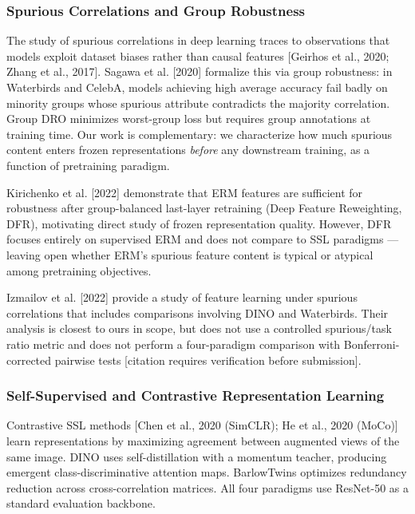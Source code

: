 
\subsubsection{Spurious Correlations and Group Robustness}

The study of spurious correlations in deep learning traces to observations that models exploit dataset biases rather than causal features [Geirhos et al., 2020; Zhang et al., 2017]. Sagawa et al. [2020] formalize this via group robustness: in Waterbirds and CelebA, models achieving high average accuracy fail badly on minority groups whose spurious attribute contradicts the majority correlation. Group DRO minimizes worst-group loss but requires group annotations at training time. Our work is complementary: we characterize how much spurious content enters frozen representations \textit{before} any downstream training, as a function of pretraining paradigm.

Kirichenko et al. [2022] demonstrate that ERM features are sufficient for robustness after group-balanced last-layer retraining (Deep Feature Reweighting, DFR), motivating direct study of frozen representation quality. However, DFR focuses entirely on supervised ERM and does not compare to SSL paradigms --- leaving open whether ERM's spurious feature content is typical or atypical among pretraining objectives.

Izmailov et al. [2022] provide a study of feature learning under spurious correlations that includes comparisons involving DINO and Waterbirds. Their analysis is closest to ours in scope, but does not use a controlled spurious/task ratio metric and does not perform a four-paradigm comparison with Bonferroni-corrected pairwise tests [citation requires verification before submission].

\subsubsection{Self-Supervised and Contrastive Representation Learning}

Contrastive SSL methods [Chen et al., 2020 (SimCLR); He et al., 2020 (MoCo)] learn representations by maximizing agreement between augmented views of the same image. DINO \citep{Caron2021DINO} uses self-distillation with a momentum teacher, producing emergent class-discriminative attention maps. BarlowTwins \citep{Zbontar2021BarlowTwins} optimizes redundancy reduction across cross-correlation matrices. All four paradigms use ResNet-50 as a standard evaluation backbone.

